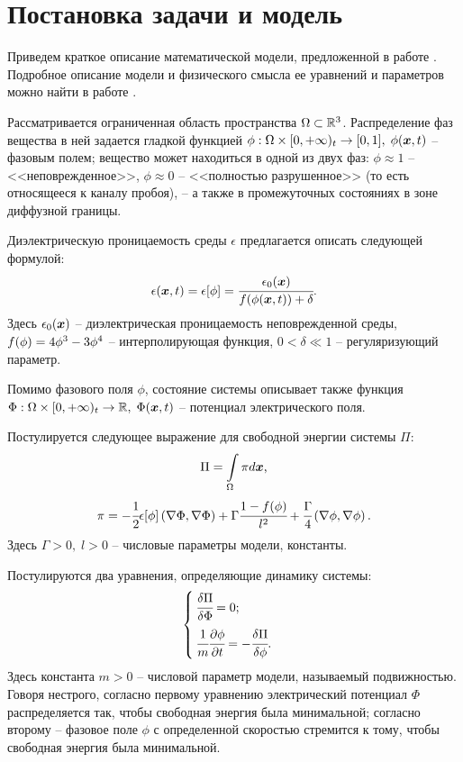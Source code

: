 
\section{Постановка задачи и модель}

Приведем краткое описание математической модели, предложенной в работе \cite{pitike_dielectric_breakdown}. Подробное описание модели и физического смысла ее уравнений и параметров можно найти в работе \cite{ponomarev_stability}.

Рассматривается ограниченная область пространства $\Omega \subset {\mathbb{R}}^3$. Распределение фаз вещества в ней задается гладкой функцией $\phi: \Omega \times [0, +\infty)_t \hm \to [0, 1], \; \phi(\vx, t)$ -- фазовым полем; вещество может находиться в одной из двух фаз: $\phi \approx 1$ -- <<неповрежденное>>, $\phi \approx 0$ -- <<полностью разрушенное>> (то есть относящееся к каналу пробоя), -- а также в промежуточных состояниях в зоне диффузной границы.

Диэлектрическую проницаемость среды $\epsilon$ предлагается описать следующей формулой:
\begin{equation}
	\epsilon({\boldsymbol{x}}, t) = \epsilon[\phi] = \cfrac{\epsilon_0({\boldsymbol{x}})}{f(\phi({\boldsymbol{x}}, t)) + \delta} {\text{.}}
	\label{eq:epsilon}
\end{equation}
Здесь $\epsilon_0({\boldsymbol{x}})$ -- диэлектрическая проницаемость неповрежденной среды, $f(\phi) \hm = 4\phi^3 - 3\phi^4$ -- интерполирующая функция, $0 < \delta \ll 1$ -- регуляризующий параметр.

Помимо фазового поля $\phi$, состояние системы описывает также функция $\Phi: \Omega \times [0, +\infty)_t \to {\mathbb{R}}, \; \Phi({\boldsymbol{x}}, t)$ -- потенциал электрического поля.

Постулируется следующее выражение для свободной энергии системы $\Pi$:
$$\Pi = \int \limits_\Omega \pi d {\boldsymbol{x}} {\text{,}}$$
$$\pi = -\cfrac{1}{2} \epsilon[\phi] \left( \nabla \Phi, \nabla \Phi \right) + \Gamma \cfrac{1 - f(\phi)}{l^2} + \cfrac{\Gamma}{4} \left( \nabla \phi, \nabla \phi \right) {\text{.}}$$
Здесь $\Gamma > 0, \; l > 0$ -- числовые параметры модели, константы.

Постулируются два уравнения, определяющие динамику системы:
\begin{equation*}
\begin{cases}
	\cfrac{\delta \Pi}{\delta \Phi} = 0 {\text{;}} \\[3mm]
	\cfrac{1}{m} \cfrac{\partial \phi}{\partial t} = -\cfrac{\delta \Pi}{\delta \phi} {\text{.}}
\end{cases}
\end{equation*}
Здесь константа $m > 0$ -- числовой параметр модели, называемый подвижностью. Говоря нестрого, согласно первому уравнению электрический потенциал $\Phi$ распределяется так, чтобы свободная энергия была минимальной; согласно второму -- фазовое поле $\phi$ с определенной скоростью стремится к тому, чтобы свободная энергия была минимальной.

